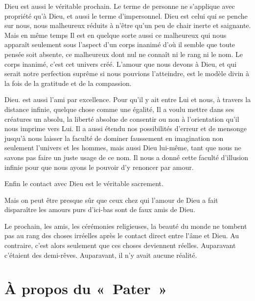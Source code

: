 \documentclass[french,twoside]{book} %
\newcommand\chapteropen{} %
\newcommand\chaptercont{} %
\newcommand\chapterclose{} %
\begin{document}
Dieu est aussi le véritable prochain. Le terme de personne ne s'applique avec propriété qu'à Dieu, et aussi le terme d'impersonnel. Dieu est celui qui se penche sur nous, nous malheureux réduits à n'être qu'un peu de chair inerte et saignante. Mais en même temps Il est en quelque sorte aussi ce malheureux qui nous apparaît seulement sous l'aspect d'un corps inanimé d'où il semble que toute pensée soit absente, ce malheureux dont nul ne connaît ni le rang ni le nom. Le corps inanimé, c'est cet univers créé. L'amour que nous devons à Dieu, et qui serait notre perfection suprême si nous pouvions l'atteindre, est le modèle divin à la fois de la gratitude et de la compassion.\par
Dieu. est aussi l'ami par excellence. Pour qu'il y ait entre Lui et nous, à travers la distance infinie, quelque chose comme une égalité, Il a voulu mettre dans ses créatures un absolu, la liberté absolue de consentir ou non à l'orientation qu'il nous imprime vers Lui. Il a aussi étendu nos possibilités d'erreur et de mensonge jusqu'à nous laisser la faculté de dominer faussement en imagination non seulement l'univers et les hommes, mais aussi Dieu lui-même, tant que nous ne savons pas faire un juste usage de ce nom. Il nous a donné cette faculté d'illusion infinie pour que nous ayons le pouvoir d'y renoncer par amour.\par
Enfin le contact avec Dieu est le véritable sacrement.\par
Mais on peut être presque sûr que ceux chez qui l'amour de Dieu a fait disparaître les amours purs d'ici-bas sont de faux amis de Dieu.\par
Le prochain, les amis, les cérémonies religieuses, la beauté du monde ne tombent pas au rang des choses irréelles après le contact direct entre l'âme et Dieu. Au contraire, c'est alors seulement que ces choses deviennent réelles. Auparavant c'étaient des demi-rêves. Auparavant, il n'y avait aucune réalité.\par

\begin{center}
\noindent \centerline{}
\end{center}

\chapterclose


\chapteropen
\chapter[{À propos du « Pater »}]{À propos du « Pater »}

\chaptercont
\end{document}
